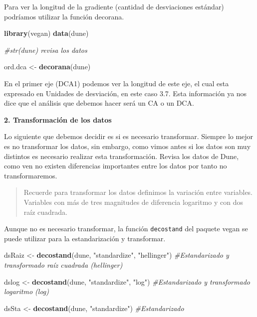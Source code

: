 \documentclass[]{book}
\newenvironment{Shaded}{\begin{snugshade}}{\end{snugshade}}
\newcommand{\KeywordTok}[1]{\textcolor[rgb]{0.13,0.29,0.53}{\textbf{{#1}}}}
\newcommand{\StringTok}[1]{\textcolor[rgb]{0.31,0.60,0.02}{{#1}}}
\newcommand{\CommentTok}[1]{\textcolor[rgb]{0.56,0.35,0.01}{\textit{{#1}}}}
\newcommand{\NormalTok}[1]{{#1}}
\begin{document}
Para ver la longitud de la gradiente (cantidad de desviaciones estándar)
podríamos utilizar la función decorana.

\begin{Shaded}
\begin{Highlighting}[]
\KeywordTok{library}\NormalTok{(vegan)}
\KeywordTok{data}\NormalTok{(dune)}

\CommentTok{#str(dune) revisa los datos}

\NormalTok{ord.dca <-}\StringTok{ }\KeywordTok{decorana}\NormalTok{(dune)}
\end{Highlighting}
\end{Shaded}

En el primer eje (DCA1) podemos ver la longitud de este eje, el cual
esta expresado en Unidades de desviación, en este caso 3.7. Esta
información ya nos dice que el análisis que debemos hacer será un CA o
un DCA.

\textbf{2. Transformación de los datos}

Lo siguiente que debemos decidir es si es necesario transformar. Siempre
lo mejor es no transformar los datos, sin embargo, como vimos antes si
los datos son muy distintos es necesario realizar esta transformación.
Revisa los datos de Dune, como ven no existen diferencias importantes
entre los datos por tanto no transformaremos.

\begin{quote}
Recuerde para transformar los datos definimos la variación entre
variables. Variables con más de tres magnitudes de diferencia logaritmo
y con dos raíz cuadrada.
\end{quote}

Aunque no es necesario transformar, la función \texttt{decostand} del
paquete vegan se puede utilizar para la estandarización y transformar.

\begin{Shaded}
\begin{Highlighting}[]
\NormalTok{dsRaiz <-}\StringTok{ }\KeywordTok{decostand}\NormalTok{(dune, }\StringTok{"standardize"}\NormalTok{, }\StringTok{"hellinger"}\NormalTok{) }
\CommentTok{#Estandarizado y transformado raíz cuadrada (hellinger)}

\NormalTok{dslog <-}\StringTok{ }\KeywordTok{decostand}\NormalTok{(dune, }\StringTok{"standardize"}\NormalTok{, }\StringTok{"log"}\NormalTok{) }
\CommentTok{#Estandarizado y transformado logaritmo (log)}

\NormalTok{dsSta <-}\StringTok{ }\KeywordTok{decostand}\NormalTok{(dune, }\StringTok{"standardize"}\NormalTok{)}
\CommentTok{#Estandarizado}
\end{Highlighting}
\end{Shaded}
\end{document}
